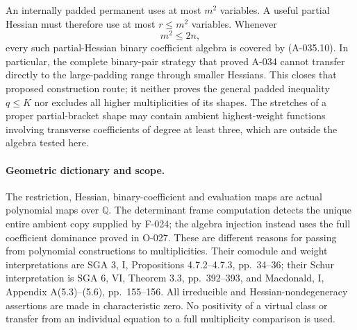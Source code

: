 An internally padded permanent uses at most \(m^2\)
variables. A useful partial Hessian must therefore
use at most \(r\leq m^2\) variables. Whenever
\[
                              m^2\leq2n,
                                                               \tag{A-035.11}
\]
every such partial-Hessian binary coefficient algebra
is covered by (A-035.10).
In particular, the complete binary-pair strategy that
proved A-034 cannot transfer directly to the large-padding
range through smaller Hessians.
This closes that proposed construction route; it
neither proves the general padded inequality \(q\leq K\)
nor excludes all higher multiplicities of its shapes.
The stretches of a proper partial-bracket shape may
contain ambient highest-weight functions involving
transverse coefficients of degree at least three,
which are outside the algebra tested here.

\paragraph{Geometric dictionary and scope.}
The restriction, Hessian, binary-coefficient and
evaluation maps are actual polynomial maps over
\(\mathbb Q\). The determinant frame computation
detects the unique entire ambient copy supplied by
F-024; the algebra injection instead uses the full
coefficient dominance proved in O-027.
These are different reasons for passing from
polynomial constructions to multiplicities.
Their comodule and weight interpretations are SGA 3,
I, Propositions 4.7.2--4.7.3, pp.~34--36; their
Schur interpretation is SGA 6, VI, Theorem 3.3,
pp.~392--393, and Macdonald, I, Appendix A(5.3)--(5.6),
pp.~155--156.
All irreducible and Hessian-nondegeneracy assertions
are made in characteristic zero. No positivity of
a virtual class or transfer from an individual
equation to a full multiplicity comparison is used.
